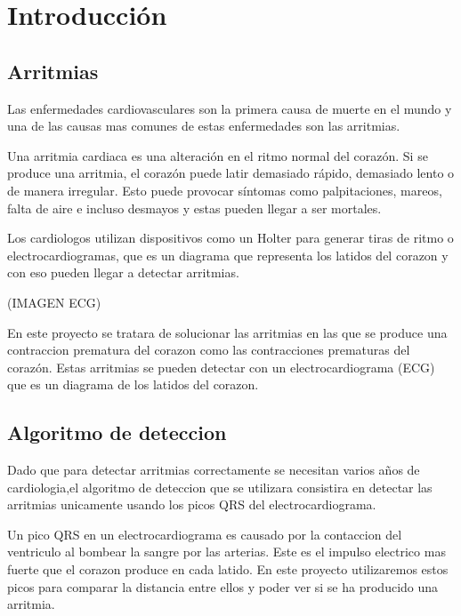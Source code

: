 \titlespacing*{\chapter}{0pt}{-1.25cm}{25pt}
\chapter{Introducción}
\section{Arritmias}
Las enfermedades cardiovasculares son la primera causa de muerte en el mundo y una de las causas mas comunes
de estas enfermedades son las arritmias.

Una arritmia cardiaca es una alteración en el ritmo normal del corazón. Si se produce una arritmia, el corazón 
puede latir demasiado rápido, demasiado lento o de manera irregular. Esto puede provocar síntomas como palpitaciones,
mareos, falta de aire e incluso desmayos y estas pueden llegar a ser mortales.

Los cardiologos utilizan dispositivos como un Holter para generar tiras de ritmo o electrocardiogramas, que es un 
diagrama que representa los latidos del corazon y con eso pueden llegar a detectar arritmias.

(IMAGEN ECG)

En este proyecto se tratara de solucionar las arritmias en las que se produce una contraccion prematura del corazon
como las contracciones prematuras del corazón. Estas arritmias se 
pueden detectar con un electrocardiograma (ECG) que es un diagrama de los latidos del corazon.



\section{Algoritmo de deteccion}
Dado que para detectar arritmias correctamente se necesitan varios años de cardiologia,el algoritmo de 
deteccion que se utilizara consistira en detectar las arritmias unicamente usando los picos QRS del electrocardiograma.

Un pico QRS en un electrocardiograma es causado por la contaccion del ventriculo al bombear la sangre por las arterias.
Este es el impulso electrico mas fuerte que el corazon produce en cada latido. En este proyecto utilizaremos estos picos
para comparar la distancia entre ellos y poder ver si se ha producido una arritmia. 

